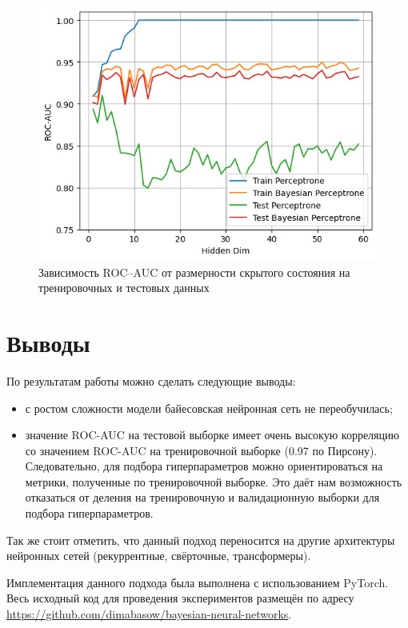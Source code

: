 \documentclass{article}
\begin{document}
\begin{figure}
    \centering
    \includegraphics[width=1\linewidth]{roc_auc.png}
    \caption{Зависимость ROC--AUC от размерности скрытого состояния на тренировочных и тестовых данных}
    \label{fig:enter-label}
\end{figure}

\section{Выводы}
По результатам работы можно сделать следующие выводы:
\begin{itemize}
    \item с ростом сложности модели байесовская нейронная сеть не переобучилась;
    \item значение ROC-AUC на тестовой выборке имеет очень высокую корреляцию со значением ROC-AUC на тренировочной выборке (0.97 по Пирсону). Следовательно, для подбора гиперпараметров можно ориентироваться на метрики, полученные по тренировочной выборке. Это даёт нам возможность отказаться от деления на тренировочную и валидационную выборки для подбора гиперпараметров.
\end{itemize}

Так же стоит отметить, что данный подход переносится на другие архитектуры нейронных сетей (рекуррентные, свёрточные, трансформеры).

Имплементация данного подхода была выполнена с использованием PyTorch. Весь исходный код для проведения экспериментов размещён по адресу \url{https://github.com/dimabasow/bayesian-neural-networks}.
\end{document}
